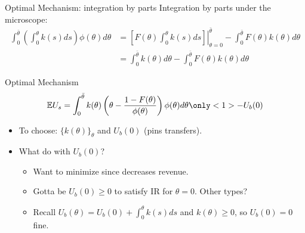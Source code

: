 \documentclass[english,10pt
,aspectratio=169
]{beamer}
\begin{document}
\begin{frame}{Optimal Mechanism: integration by parts}
Integration by parts under the microscope:
\begin{align*}
	\int_0^{\bar{\theta}} \left( \int_0^\theta k(s) ds \right) \phi(\theta) d\theta &= \left. \left[F(\theta) \int_0^\theta k(s) ds \right] \right|_{\theta=0}^{\bar{\theta}} - \int_0^{\bar{\theta}} F(\theta) k(\theta) d\theta
	\\ &= \int_0^{\bar{\theta}} k(\theta) d\theta - \int_0^{\bar{\theta}} F(\theta) k(\theta) d\theta
\end{align*}
\end{frame}


\begin{frame}{Optimal Mechanism}
\begin{equation*}
	\mathbb{E} U_s = \int_0^{\bar{\theta}} k(\theta) \left( \theta - \frac{1-F(\theta)}{\phi(\theta)} \right) \phi(\theta) d\theta \only<1>{- U_b(0)} %
\end{equation*}
\begin{itemize}
	\item To choose: $\{k(\theta)\}_\theta$ and $U_b(0)$ (pins transfers).
	\pause
	\item What do with $U_b(0)$?
	\begin{itemize}
		\item Want to minimize since decreases revenue.
		\item Gotta be $U_b(0) \geq 0$ to satisfy IR for $\theta = 0$. Other types?
		\pause
		\item Recall $U_b(\theta) = U_b(0) + \int_0^\theta k(s) ds$ and $k(\theta) \geq 0$, so $U_b(0) = 0$ fine.
	\end{itemize}
\end{itemize}
\end{frame}
\end{document}
